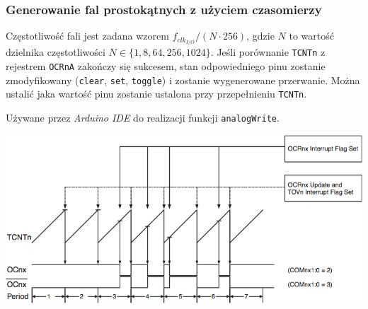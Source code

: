\documentclass[8pt]{beamer}
\begin{document}
\begin{frame}
  \frametitle{Generowanie fal prostokątnych z użyciem czasomierzy}

  Częstotliwość fali jest zadana wzorem $f_{clk_{I/O}} / (N \cdot 256)$, gdzie
  $N$ to wartość dzielnika częstotliwości $N \in \{1,8,64,256,1024\}$.  Jeśli
  porównanie \texttt{TCNTn} z rejestrem \texttt{OCRnA} zakończy się sukcesem,
  stan odpowiedniego pinu zostanie zmodyfikowany (\texttt{clear}, \texttt{set},
  \texttt{toggle}) i zostanie wygenerowane przerwanie. Można ustalić jaka
  wartość pinu zostanie ustalona przy przepełnieniu \texttt{TCNTn}.
  
  \begin{exampleblock}{}
    Używane przez \textit{Arduino IDE} do realizacji funkcji \texttt{analogWrite}.
  \end{exampleblock}

  \begin{center}
    \includegraphics[scale=0.75]{images/fast-pwm.png}
  \end{center}
\end{frame}
\end{document}
